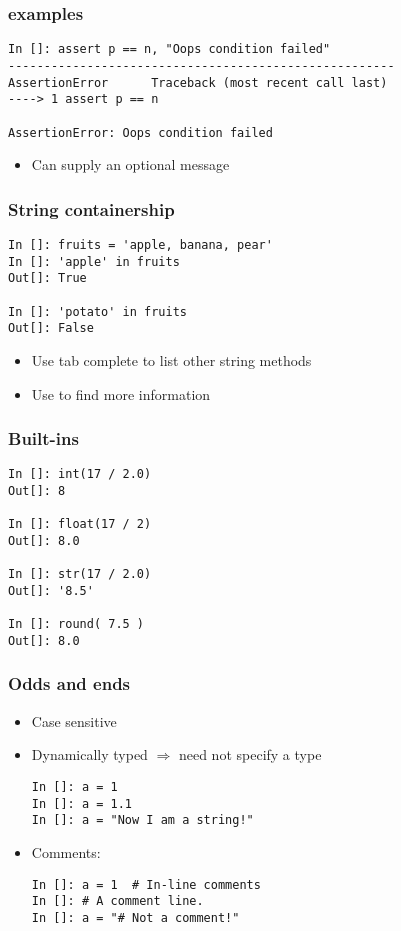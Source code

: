 \documentclass[14pt,compress]{beamer}
\begin{document}
\begin{frame}[fragile]
  \frametitle{ examples}
  \begin{small}
\begin{lstlisting}
In []: assert p == n, "Oops condition failed"
------------------------------------------------------
AssertionError      Traceback (most recent call last)
----> 1 assert p == n

AssertionError: Oops condition failed
\end{lstlisting}
  \end{small}
  \begin{itemize}
  \item Can supply an optional message
  \end{itemize}
\end{frame}


\begin{frame}[fragile]
\frametitle{String containership}
  \begin{lstlisting}
In []: fruits = 'apple, banana, pear'
In []: 'apple' in fruits
Out[]: True

In []: 'potato' in fruits
Out[]: False

\end{lstlisting}
  \begin{itemize}
  \item Use tab complete to list other string methods
  \item Use  to find more information
  \end{itemize}

\end{frame}

\begin{frame}[fragile]
  \frametitle{Built-ins}
  \begin{lstlisting}
In []: int(17 / 2.0)
Out[]: 8

In []: float(17 / 2)
Out[]: 8.0

In []: str(17 / 2.0)
Out[]: '8.5'

In []: round( 7.5 )
Out[]: 8.0
  \end{lstlisting}
\end{frame}

\begin{frame}[fragile]
  \frametitle{Odds and ends}
  \begin{itemize}
    \item Case sensitive
    \item Dynamically typed $\Rightarrow$ need not specify a type
      \begin{lstlisting}
In []: a = 1
In []: a = 1.1
In []: a = "Now I am a string!"
      \end{lstlisting}
    \item Comments:
      \begin{lstlisting}
In []: a = 1  # In-line comments
In []: # A comment line.
In []: a = "# Not a comment!"
      \end{lstlisting}
  \end{itemize}
\end{frame}
\end{document}
